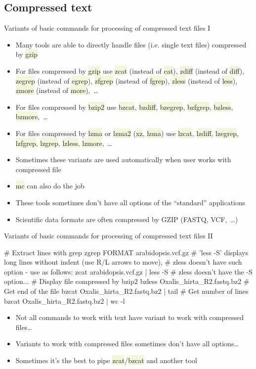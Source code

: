 \documentclass[compress, xelatex, 11pt, xcolor=svgnames, aspectratio=169, url={hyphens, lowtilde}]{beamer}
\renewcommand{\texttt}[1]{\colorbox{Beige}{{\ttfamily #1}}}
\begin{document}
\subsection{Compressed text}

\begin{frame}{Variants of basic commands for processing of compressed text files I}
	\begin{itemize}
		\item Many tools are able to directly handle files (i.e. single text files) compressed by \texttt{gzip}
		\item For files compressed by \texttt{gzip} use \texttt{zcat} (instead of \texttt{cat}), \texttt{zdiff} (instead of \texttt{diff}), \texttt{zegrep} (instead of \texttt{egrep}), \texttt{zfgrep} (instead of \texttt{fgrep}), \texttt{zless} (instead of \texttt{less}), \texttt{zmore} (instead of \texttt{more}),~\ldots
		\item For files compressed by \texttt{bzip2} use \texttt{bzcat}, \texttt{bzdiff}, \texttt{bzegrep}, \texttt{bzfgrep}, \texttt{bzless}, \texttt{bzmore},~\ldots
		\item For files compressed by \texttt{lzma} or \texttt{lzma2} (\texttt{xz}, \texttt{lzma}) use \texttt{lzcat}, \texttt{lzdiff}, \texttt{lzegrep}, \texttt{lzfgrep}, \texttt{lzgrep}, \texttt{lzless}, \texttt{lzmore},~\ldots
		\item Sometimes these variants are used automatically when user works with compressed file
		\item \texttt{mc} can also do the job
		\item These tools sometimes don't have all options of the \enquote{standard} applications
		\item Scientific data formats are often compressed by GZIP (FASTQ, VCF,~\ldots)
	\end{itemize}
\end{frame}

\begin{frame}[fragile]{Variants of basic commands for processing of compressed text files II}
	\begin{bashcode}
    # Extract lines with grep
    zgrep FORMAT arabidopsis.vcf.gz
    # 'less -S' displays long lines without indent (use R/L arrows to move),
    # zless doesn't have such option - use as follows:
    zcat arabidopsis.vcf.gz | less -S # zless doesn't have the -S option...
    # Display file compressed by bzip2
    bzless Oxalis_hirta_R2.fastq.bz2
    # Get end of the file
    bzcat Oxalis_hirta_R2.fastq.bz2 | tail
    # Get number of lines
    bzcat Oxalis_hirta_R2.fastq.bz2 | wc -l
	\end{bashcode}
	\begin{itemize}
		\item Not all commands to work with text have variant to work with compressed files\ldots
		\item Variants to work with compressed files sometimes don't have all options\ldots
		\item Sometimes it's the best to pipe \texttt{zcat}/\texttt{bzcat} and another tool
	\end{itemize}
\end{frame}
\end{document}
